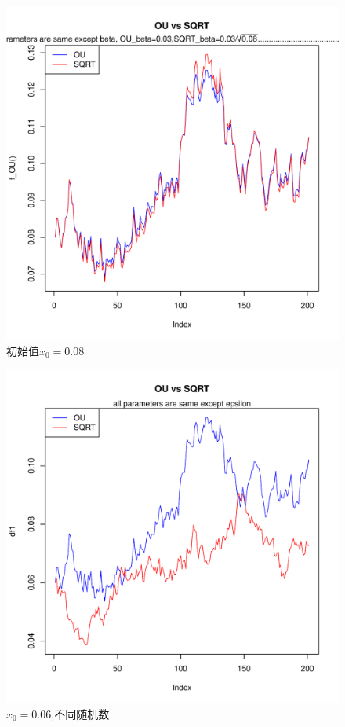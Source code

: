 \documentclass[UTF8]{ctexart}
\begin{document}
\begin{figure}[H]
\centering
\includegraphics{P56.pdf}
\caption*{初始值$x_0 =0.08$ \quad \footnotemark}
\end{figure}
\begin{figure}[H]
\centering
\includegraphics{P56_2.pdf}
\caption*{$x_0 =0.06$,不同随机数}
\end{figure}
\end{document}
